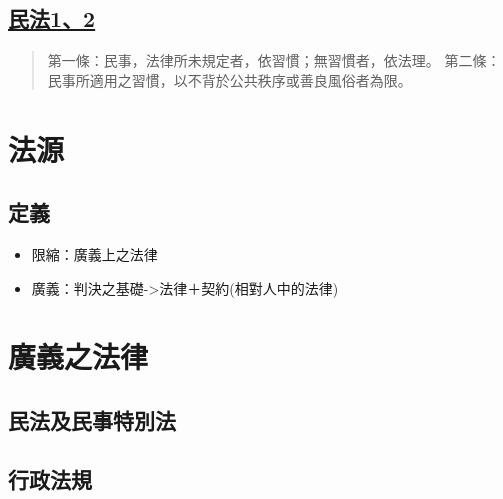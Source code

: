 \documentclass[
]{book}
\providecommand{\tightlist}{%
  \setlength{\itemsep}{0pt}\setlength{\parskip}{0pt}}
\begin{document}
\hypertarget{ux6c11ux6cd512}{%
\subsection{\texorpdfstring{\href{https://law.moj.gov.tw/LawClass/LawAll.aspx?pcode=B0000001}{民法1、2}}{民法1、2}}\label{ux6c11ux6cd512}}

\begin{quote}
第一條：民事，法律所未規定者，依習慣；無習慣者，依法理。
第二條：民事所適用之習慣，以不背於公共秩序或善良風俗者為限。
\end{quote}

\pagebreak

\hypertarget{ux6cd5ux6e90}{%
\section{法源}\label{ux6cd5ux6e90}}

\hypertarget{ux5b9aux7fa9}{%
\subsection{定義}\label{ux5b9aux7fa9}}

\begin{itemize}
\tightlist
\item
  限縮：廣義上之法律
\item
  廣義：判決之基礎-\textgreater 法律＋契約(相對人中的法律)
\end{itemize}

\hypertarget{ux5ee3ux7fa9ux4e4bux6cd5ux5f8b}{%
\section{廣義之法律}\label{ux5ee3ux7fa9ux4e4bux6cd5ux5f8b}}

\hypertarget{ux6c11ux6cd5ux53caux6c11ux4e8bux7279ux5225ux6cd5}{%
\subsection{民法及民事特別法}\label{ux6c11ux6cd5ux53caux6c11ux4e8bux7279ux5225ux6cd5}}

\hypertarget{ux884cux653fux6cd5ux898f}{%
\subsection{行政法規}\label{ux884cux653fux6cd5ux898f}}
\end{document}
